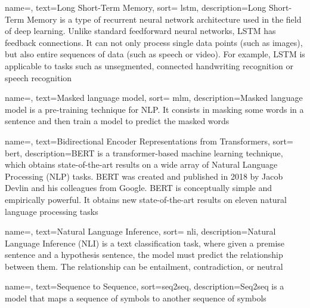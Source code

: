 {
    name=,
    text=Long Short-Term Memory,
    sort= lstm,
    description={Long Short-Term Memory is a type of recurrent neural network architecture used in the field of deep learning. Unlike standard feedforward neural networks, LSTM has feedback connections. It can not only process single data points (such as images), but also entire sequences of data (such as speech or video). For example, LSTM is applicable to tasks such as unsegmented, connected handwriting recognition or speech recognition}
}

{
    name=,
    text=Masked language model,
    sort= mlm,
    description={Masked language model is a pre-training technique for NLP. It consists in masking some words in a sentence and then train a model to predict the masked words}
}

{
    name=,
    text=Bidirectional Encoder Representations from Transformers,
    sort= bert,
    description={BERT is a transformer-based machine learning technique, which obtains state-of-the-art results on a wide array of Natural Language Processing (NLP) tasks. BERT was created and published in 2018 by Jacob Devlin and his colleagues from Google. BERT is conceptually simple and empirically powerful. It obtains new state-of-the-art results on eleven natural language processing tasks}
}

{
    name=,
    text=Natural Language Inference,
    sort= nli,
    description={Natural Language Inference (NLI) is a text classification task, where given a premise sentence and a hypothesis sentence, the model must predict the relationship between them. The relationship can be entailment, contradiction, or neutral}
}

{
    name=,
    text=Sequence to Sequence,
    sort=seq2seq,
    description={Seq2seq is a model that maps a sequence of symbols to another sequence of symbols}
}

